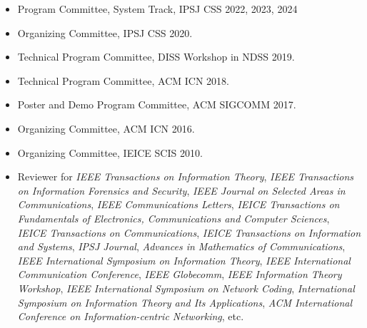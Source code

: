 \begin{itemize}
 \item Program Committee, System Track, IPSJ CSS 2022, 2023, 2024
 \item Organizing Committee, IPSJ CSS 2020.
 \item Technical Program Committee, DISS Workshop in NDSS 2019.
 \item Technical Program Committee, ACM ICN 2018.
 \item Poster and Demo Program Committee, ACM SIGCOMM 2017.
 \item Organizing Committee, ACM ICN 2016.
 \item Organizing Committee, IEICE SCIS 2010.
 \item Reviewer for
\textit{IEEE Transactions on Information Theory},
\textit{IEEE Transactions on Information Forensics and Security},
\textit{IEEE Journal on Selected Areas in Communications},
\textit{IEEE Communications Letters},
\textit{IEICE Transactions on Fundamentals of Electronics, Communications and Computer Sciences},
\textit{IEICE Transactions on Communications},
\textit{IEICE Transactions on Information and Systems},
\textit{IPSJ Journal},
\textit{Advances in Mathematics of Communications},
\textit{IEEE International Symposium on Information Theory},
\textit{IEEE International Communication Conference},
\textit{IEEE Globecomm},
\textit{IEEE Information Theory Workshop},
\textit{IEEE International Symposium on Network Coding},
\textit{International Symposium on Information Theory and Its Applications},
\textit{ACM International Conference on Information-centric Networking},
%
etc.
\end{itemize}
